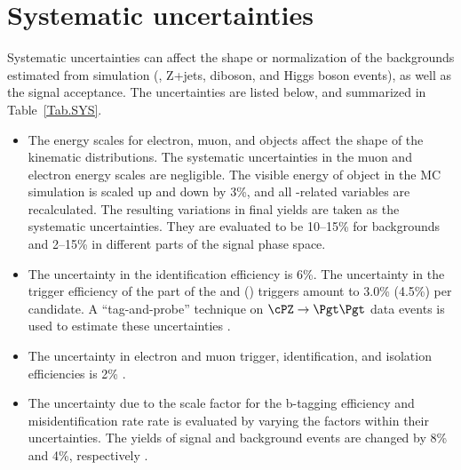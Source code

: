 \section{Systematic uncertainties}
\label{sect:sys}
Systematic uncertainties can affect the shape or normalization of the
backgrounds estimated from simulation (\ttbar, Z+jets, diboson, and Higgs boson events), 
as well as the signal acceptance. 
The uncertainties are listed below, and summarized in Table~\ref{Tab.SYS}.


\begin{itemize}


\item  The energy scales for electron, muon, and \Tau objects affect the shape of the kinematic distributions.
 The systematic uncertainties in the muon and electron energy scales are negligible.
The visible energy of \Tau object in the MC simulation is scaled up and down
by 3\%, and all \Tau-related variables are recalculated. The resulting variations in
final yields are taken as the systematic uncertainties. They are evaluated to be 10--15\% for 
backgrounds and 2--15\% in different parts of the signal phase space.



\item The uncertainty in the \Tau identification efficiency is 6\%. 
  The uncertainty in the trigger efficiency of the \Tau part of the \eTau and
  \muTau (\tauTau) triggers amount to 3.0\% (4.5\%) per \Tau candidate.
  A ``tag-and-probe'' technique \cite{Chatrchyan:2014mua} on $\cPZ\to \Pgt\Pgt$ data events is used to estimate these 
  uncertainties \cite{Khachatryan:2014wca}.


\item The uncertainty in electron and muon trigger, identification, and
  isolation efficiencies is 2\% \cite{Khachatryan:2014wca}.


\item The uncertainty due to the scale 
factor for the b-tagging efficiency and misidentification rate
rate is evaluated by varying the 
factors within their uncertainties. The yields of signal and background events are changed by 8\% 
and 4\%, respectively \cite{Chatrchyan:2012jua}.
 

\end{itemize}
